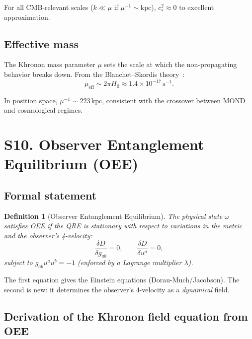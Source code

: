 \documentclass[aps,prd,preprint,superscriptaddress,longbibliography]{revtex4-2}
\newtheorem{definition}[theorem]{Definition}
\newcommand{\KL}{D}
\begin{document}
For all CMB-relevant scales ($k\ll\mu$ if $\mu^{-1}\sim\mathrm{kpc}$),
$c_s^2\approx 0$ to excellent approximation.

\subsection{Effective mass}

The Khronon mass parameter
$\mu$ sets the scale at which the non-propagating behavior breaks
down.  From the Blanchet--Skordis theory~\cite{BlanchetSkordis2024}:
\begin{equation}
\mu_{\mathrm{eff}} \sim 2\pi H_0
\approx 1.4\times 10^{-17}\,\mathrm{s}^{-1}.
\label{eq:mu_eff}
\end{equation}

In position space, $\mu^{-1}\sim 223\,\mathrm{kpc}$, consistent with
the crossover between MOND and cosmological regimes.

\section{S10. Observer Entanglement Equilibrium (OEE)}
\label{sec:OEE}

\subsection{Formal statement}

\begin{definition}[Observer Entanglement Equilibrium]
The physical state $\omega$ satisfies OEE if the QRE is stationary
with respect to variations in the metric \emph{and} the observer's
4-velocity:
\begin{equation}
\frac{\delta\KL}{\delta g_{ab}} = 0,
\qquad
\frac{\delta\KL}{\delta u^a} = 0,
\label{eq:OEE}
\end{equation}
subject to $g_{ab}u^a u^b = -1$ (enforced by a Lagrange multiplier
$\lambda$).
\end{definition}

The first equation gives the Einstein equations (Dorau-Much/Jacobson).
The second is new: it determines the observer's 4-velocity as a
\emph{dynamical} field.

\subsection{Derivation of the Khronon field equation from OEE}
\end{document}
